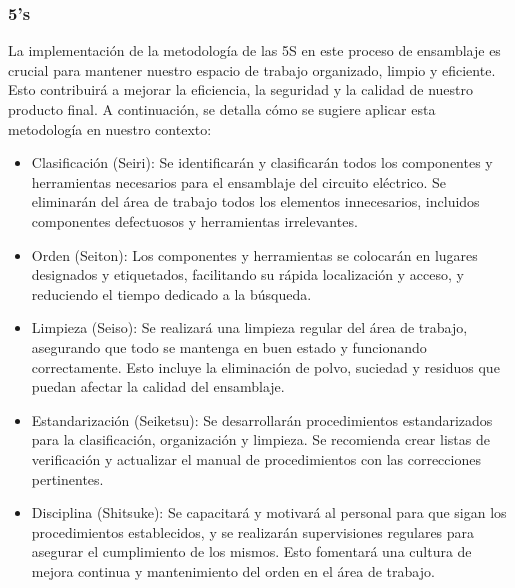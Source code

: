     \subsubsection{5's}
     
    La implementación de la metodología de las 5S en este proceso de ensamblaje es crucial para mantener nuestro espacio de trabajo organizado, limpio y eficiente. Esto contribuirá a mejorar la eficiencia, la seguridad y la calidad de nuestro producto final. A continuación, se detalla cómo se sugiere aplicar esta metodología en nuestro contexto:
    \begin{itemize}
    
    \item Clasificación (Seiri): Se identificarán y clasificarán todos los componentes y herramientas necesarios para el ensamblaje del circuito eléctrico. Se eliminarán del área de trabajo todos los elementos innecesarios, incluidos componentes defectuosos y herramientas irrelevantes.
    
     \item Orden (Seiton): Los componentes y herramientas se colocarán en lugares designados y etiquetados, facilitando su rápida localización y acceso, y reduciendo el tiempo dedicado a la búsqueda.
    
    \item Limpieza (Seiso): Se realizará una limpieza regular del área de trabajo, asegurando que todo se mantenga en buen estado y funcionando correctamente. Esto incluye la eliminación de polvo, suciedad y residuos que puedan afectar la calidad del ensamblaje.
    
     \item Estandarización (Seiketsu): Se desarrollarán procedimientos estandarizados para la clasificación, organización y limpieza. Se recomienda crear listas de verificación y actualizar el manual de procedimientos con las correcciones pertinentes.
    
     \item Disciplina (Shitsuke): Se capacitará y motivará al personal para que sigan los procedimientos establecidos, y se realizarán supervisiones regulares para asegurar el cumplimiento de los mismos. Esto fomentará una cultura de mejora continua y mantenimiento del orden en el área de trabajo.
    \end{itemize}
    
    
